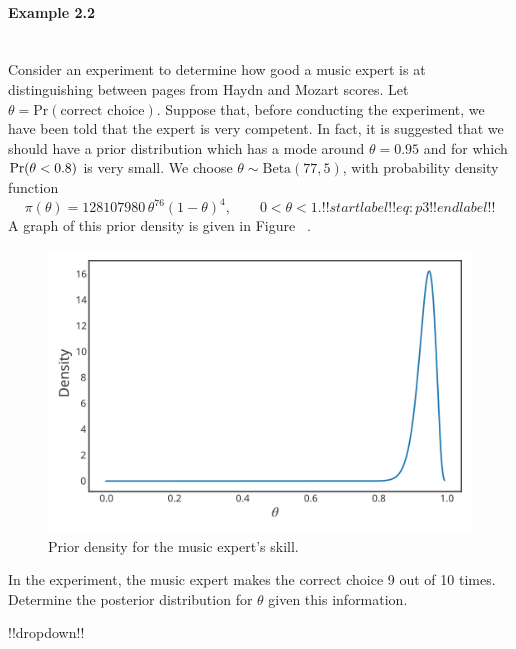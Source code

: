 \paragraph{Example 2.2}{~\\
Consider an experiment to determine how good a music expert is at  distinguishing between pages from Haydn and Mozart scores. Let $\theta=\text{Pr}(\text{correct choice})$. Suppose that, before conducting the experiment, we have been told that the expert is very competent. In fact, it is suggested that we should have a prior distribution which has a mode around $\theta=0.95$ and for which $\textnormal{Pr}(\theta<0.8)$ is very small. We choose $\theta\sim \mathrm{Beta}(77,5)$, with probability density function
\begin{equation}
\pi(\theta)=128107980\,\theta^{76}(1-\theta)^4,\quad\quad 0<\theta<1.
!!startlabel!! eq:p3 !!endlabel!!
\end{equation}
A graph of this prior density is given in Figure ~.
\begin{figure}[ht]

\includegraphics{images/priorplot2.svg}
\caption{Prior density for the music expert's skill.}
\label{fig:betaplot3}

\end{figure}

In the experiment, the music expert makes the correct choice 9 out of 10 times. Determine the posterior distribution for $\theta$ given this information.






!!dropdown!!

}
